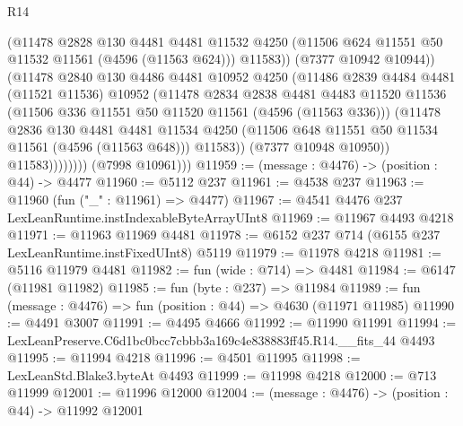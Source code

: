 \begin{lexlean}{R14}
\begin{coremodule}
                          (@11478
                            @2828
                            @130
                            @4481
                            @4481
                            @11532
                            @4250
                            (@11506 @624 @11551 @50 @11532 @11561 (@4596 (@11563 @624)))
                            @11583))
                        (@7377 @10942 @10944))
                      (@11478
                        @2840
                        @130
                        @4486
                        @4481
                        @10952
                        @4250
                        (@11486
                          @2839
                          @4484
                          @4481
                          (@11521 @11536)
                          @10952
                          (@11478
                            @2834
                            @2838
                            @4481
                            @4483
                            @11520
                            @11536
                            (@11506 @336 @11551 @50 @11520 @11561 (@4596 (@11563 @336)))
                            (@11478
                              @2836
                              @130
                              @4481
                              @4481
                              @11534
                              @4250
                              (@11506 @648 @11551 @50 @11534 @11561 (@4596 (@11563 @648)))
                              @11583))
                          (@7377 @10948 @10950))
                        @11583))))))))
        (@7998 @10961)))
@11959 := (message : @4476) -> (position : @44) -> @4477
@11960 := @5112 @237
@11961 := @4538 @237
@11963 := @11960 (fun ("_" : @11961) => @4477)
@11967 := @4541 @4476 @237 LexLeanRuntime.instIndexableByteArrayUInt8
@11969 := @11967 @4493 @4218
@11971 := @11963 @11969 @4481
@11978 := @6152 @237 @714 (@6155 @237 LexLeanRuntime.instFixedUInt8) @5119
@11979 := @11978 @4218
@11981 := @5116 @11979 @4481
@11982 := fun (wide : @714) => @4481
@11984 := @6147 (@11981 @11982)
@11985 := fun (byte : @237) => @11984
@11989 := fun (message : @4476) => fun (position : @44) => @4630 (@11971 @11985)
@11990 := @4491 @3007
@11991 := @4495 @4666
@11992 := @11990 @11991
@11994 := LexLeanPreserve.C6d1bc0bcc7cbbb3a169c4e838883ff45.R14.__fits_44 @4493
@11995 := @11994 @4218
@11996 := @4501 @11995
@11998 := LexLeanStd.Blake3.byteAt @4493
@11999 := @11998 @4218
@12000 := @713 @11999
@12001 := @11996 @12000
@12004 := (message : @4476) -> (position : @44) -> @11992 @12001

\end{coremodule}
\end{lexlean}
